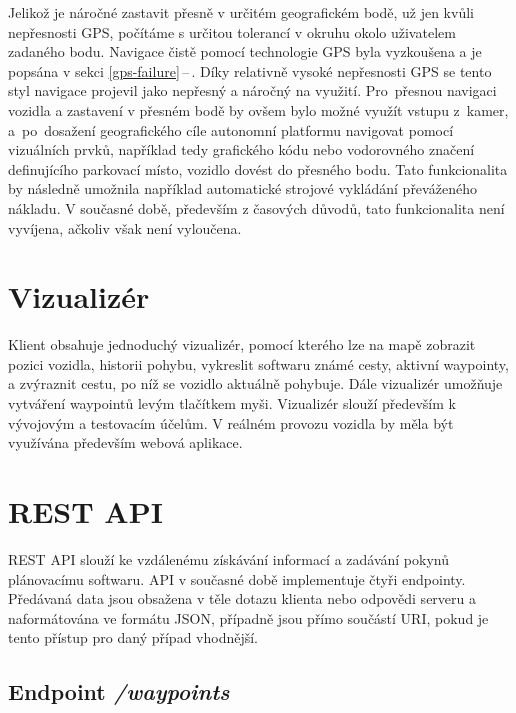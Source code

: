 \documentclass[czech, bachelor]{diploma}
\newcommand{\peteref}[1]{\ref{#1}\,--\,\nameref{#1}}
\begin{document}
Jelikož je náročné zastavit přesně v určitém geografickém bodě, už jen kvůli nepřesnosti GPS, počítáme s určitou tolerancí
v okruhu okolo uživatelem zadaného bodu. Navigace čistě pomocí technologie GPS byla vyzkoušena a je popsána v sekci
\peteref{gps-failure}. Díky relativně vysoké nepřesnosti GPS se tento styl navigace projevil jako nepřesný a náročný na využití.
Pro~přesnou navigaci vozidla a zastavení v přesném bodě by ovšem bylo možné využít vstupu z~kamer, a~po~dosažení geografického
cíle autonomní platformu navigovat pomocí vizuálních prvků, například tedy grafického kódu nebo vodorovného značení definujícího
parkovací místo, vozidlo dovést do přesného bodu. Tato funkcionalita by následně umožnila například automatické strojové vykládání
převáženého nákladu. V současné době, především z časových důvodů, tato funkcionalita není vyvíjena, ačkoliv však není vyloučena.

\section{Vizualizér} \label{visualizer}

Klient obsahuje jednoduchý vizualizér, pomocí kterého lze na mapě zobrazit pozici vozidla, historii pohybu, vykreslit
softwaru známé cesty, aktivní waypointy, a zvýraznit cestu, po níž se vozidlo aktuálně pohybuje. Dále vizualizér umožňuje
vytváření waypointů levým tlačítkem myši. Vizualizér slouží především k vývojovým a testovacím účelům. V reálném provozu vozidla
by měla být využívána především webová aplikace.

\section{REST API} \label{rest-api}

REST API\cite{rest-source} slouží ke vzdálenému získávání informací a zadávání pokynů plánovacímu softwaru. API v současné době
implementuje čtyři endpointy. Předávaná data jsou obsažena v těle dotazu klienta nebo odpovědi serveru a naformátována ve formátu
JSON\cite{json-source}, případně jsou přímo součástí URI\cite{http-source}, pokud je tento přístup pro daný případ vhodnější.

\subsection{Endpoint \emph{/waypoints}}
\end{document}
